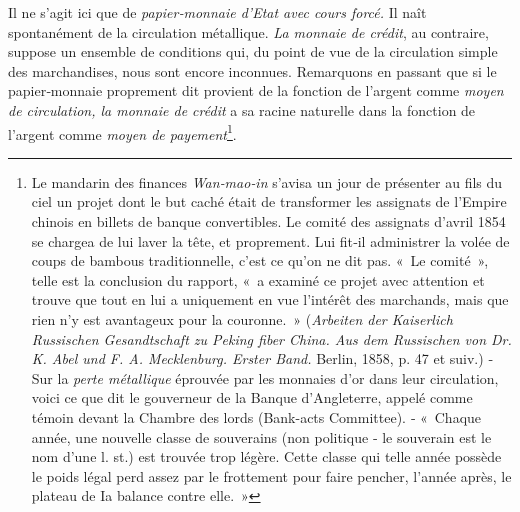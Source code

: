 \documentclass[french,twoside]{book} %
\begin{document}
Il ne s’agit ici que de \emph{papier‑monnaie d’Etat avec cours forcé.} Il naît spontanément de la circulation métallique. \emph{La monnaie de crédit}, au contraire, suppose un ensemble de conditions qui, du point de vue de la circulation simple des marchandises, nous sont encore inconnues. Remarquons en passant que si le papier‑monnaie proprement dit provient de la fonction de l’argent comme \emph{moyen de circulation, la monnaie de crédit} a sa racine naturelle dans la fonction de l’argent comme \emph{moyen de payement}\footnote{Le mandarin des finances \emph{Wan‑mao‑in} s’avisa un jour de présenter au fils du ciel un projet dont le but caché était de transformer les assignats de l’Empire chinois en billets de banque convertibles. Le comité des assignats d’avril 1854 se chargea de lui laver la tête, et proprement. Lui fit‑il administrer la volée de coups de bambous traditionnelle, c’est ce qu’on ne dit pas. « Le comité », telle est la conclusion du rapport, « a examiné ce projet avec attention et trouve que tout en lui a uniquement en vue l’intérêt des marchands, mais que rien n’y est avantageux pour la couronne. » (\emph{Arbeiten der Kaiserlich Russischen Gesandtschaft zu Peking fiber China. Aus dem Russischen von Dr. K. Abel und F. A. Mecklenburg. Erster Band.} Berlin, 1858, p. 47 et suiv.) ‑ Sur la \emph{perte métallique} éprouvée par les monnaies d’or dans leur circulation, voici ce que dit le gouverneur de la Banque d’Angleterre, appelé comme témoin devant la Chambre des lords (Bank-acts Committee). ‑ « Chaque année, une nouvelle classe de souverains (non politique ‑ le souverain est le nom d’une l. st.) est trouvée trop légère. Cette classe qui telle année possède le poids légal perd assez par le frottement pour faire pencher, l’année après, le plateau de Ia balance contre elle. »}.\par
\end{document}
